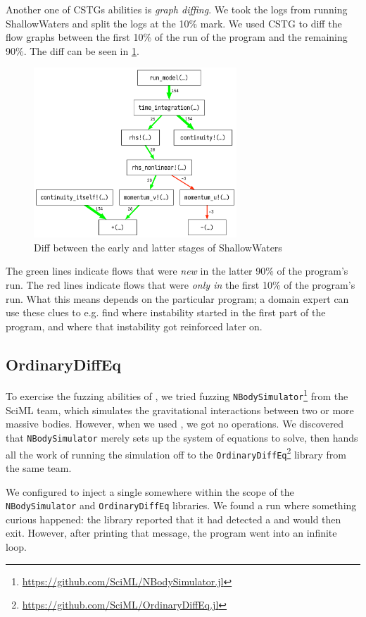 \documentclass{juliacon}
\begin{document}
Another one of CSTGs abilities is \emph{graph diffing}.
We took the \FT{} logs from running ShallowWaters and split the logs at the 10\% mark.
We used CSTG to diff the flow graphs between the first 10\% of the run of the program and the remaining 90\%.
The diff can be seen in \cref{fig:cstg_diff_demo}.

\begin{figure}
  \centering
  \includegraphics[width=3in]{./fig/cstg_diff_pretty.png}
  \caption{Diff between the early and latter stages of ShallowWaters}
  \label{fig:cstg_diff_demo}
\end{figure}

The green lines indicate flows that were \emph{new} in the latter 90\% of the program's run.
The red lines indicate flows that were \emph{only in} the first 10\% of the program's run.
What this means depends on the particular program; a domain expert can use these clues to e.g. find where instability started in the first part of the program, and where that instability got reinforced later on.

\subsection{OrdinaryDiffEq}
\label{s:ode}

To exercise the fuzzing abilities of \FT{}, we tried fuzzing \texttt{NBodySimulator}\footnote{\url{https://github.com/SciML/NBodySimulator.jl}} from the SciML team, which simulates the gravitational interactions between two or more massive bodies.
However, when we used \FT{}, we got no \fp{} operations.
We discovered that \texttt{NBodySimulator} merely sets up the system of equations to solve, then hands all the work of running the simulation off to the \texttt{OrdinaryDiffEq}\footnote{\url{https://github.com/SciML/OrdinaryDiffEq.jl}} library from the same team.

We configured \FT{} to inject a single \NaN{} somewhere within the scope of the \texttt{NBodySimulator} and \texttt{OrdinaryDiffEq} libraries.
We found a run where something curious happened: the library reported that it had detected a \NaN{} and would then exit.
However, after printing that message, the program went into an infinite loop.
\end{document}
